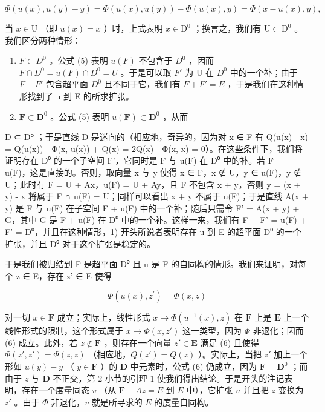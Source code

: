 \[
\Phi (u (x), u (y) - y) = \Phi (u (x), u (y)) - \Phi (u (x), y) = \Phi (x - u (x), y),
\]

当 \(x \in \mathrm{U}\) （即 \(u(x) = x\) ）时，上式表明 \(x \in \mathrm{D}^0\) ；换言之，我们有 \(\mathrm{U} \subset \mathrm{D}^0\) 。我们区分两种情形：

\begin{enumerate}
\def\labelenumi{\alph{enumi})}
\item
  \(F \subset D^{0}\) 。公式 (5) 表明 \(u(F)\) 不包含于 \(D^{0}\) ，因而 \(F \cap D^{0} = u(F) \cap D^{0} = U\) 。于是可以取 \(F'\) 为 U 在 \(D^{0}\) 中的一个补；由于 \(F + F'\) 包含超平面 \(D^{0}\) 且不同于它，我们有 \(F + F' = E\) ，于是我们在这种情形找到了 u 到 E 的所求扩张。
\item
  \(\mathbf{F} \subset \mathbf{D}^0\) 。公式 (5) 表明 \(u(\mathbf{F}) \subset \mathbf{D}^0\) ，从而
\end{enumerate}

D ⊂ D⁰ ；于是直线 D 是迷向的（相应地，奇异的，因为对 x ∈ F 有 Q(u(x) - x) = Q(u(x)) - Φ(x, u(x)) + Q(x) = 2Q(x) - Φ(x, x) = 0）。在这些条件下，我们将证明存在 D⁰ 的一个子空间 F'，它同时是 F 与 u(F) 在 D⁰ 中的补。若 F = u(F)，这是直接的。否则，取向量 x 与 y 使得 x ∈ F，x ∉ U，y ∈ u(F)，y ∉ U；此时有 F = U + Ax，u(F) = U + Ay，且 F 不包含 x + y，否则 y = (x + y) - x 将属于 F ∩ u(F) = U；同样可以看出 x + y 不属于 u(F)；于是直线 A(x + y) 是 F 与 u(F) 在子空间 F + u(F) 中的一个补；随后只需令 F' = A(x + y) + G，其中 G 是 F + u(F) 在 D⁰ 中的一个补。这样一来，我们有 F + F' = u(F) + F' = D⁰，并且在这种情形，1) 开头所说者表明存在 u 到 E 的超平面 D⁰ 的一个扩张，并且 D⁰ 对于这个扩张是稳定的。

于是我们被归结到 F 是超平面 D⁰ 且 u 是 F 的自同构的情形。我们来证明，对每个 z ∈ E，存在 z' ∈ E 使得

\[
\Phi (u (x), z ^ {\prime}) = \Phi (x, z)\tag{6}
\]

对一切 \(x \in \mathbf{F}\) 成立；实际上，线性形式 \(x \to \Phi(u^{-1}(x), z)\) 在 \(\mathbf{F}\) 上是 \(\mathbf{E}\) 上一个线性形式的限制，这个形式属于 \(x \to \Phi(x, z')\) 这一类型，因为 \(\Phi\) 非退化；因而 (6) 成立。此外，若 \(z \notin \mathbf{F}\) ，则存在一个向量 \(z' \in \mathbf{E}\) 满足 (6) 且使得 \(\Phi(z', z') = \Phi(z, z)\) （相应地，\(Q(z') = Q(z)\) ）。实际上，当把 \(z'\) 加上一个形如 \(u(y) - y\) （ \(y \in \mathbf{F}\) ）的 \(\mathbf{D}\) 中元素时，公式 (6) 仍成立，因为 \(\mathbf{F} = \mathbf{D}^0\) ；而由于 \(z\) 与 \(\mathbf{D}\) 不正交，第 2 小节的引理 1 使我们得出结论。于是开头的注记表明，存在一个度量同态 \(v\) （从 \(\mathbf{F} + A z = E\) 到 \(E\) 中），它扩张 \(u\) 并且把 \(z\) 变换为 \(z'\) 。由于 \(\Phi\) 非退化，\(v\) 就是所寻求的 \(E\) 的度量自同构。

